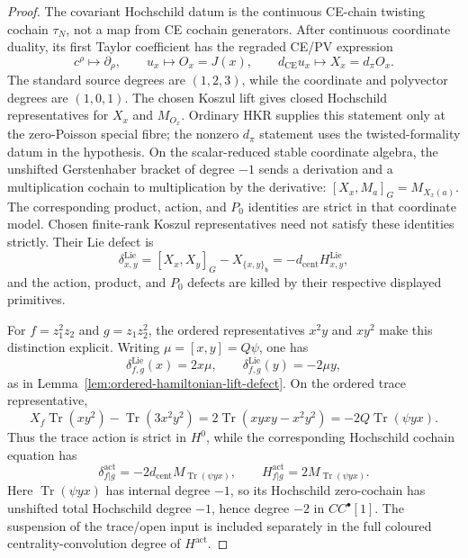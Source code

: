 \begin{proof}
The covariant Hochschild datum is the continuous CE-chain twisting
cochain \(\tau_N\), not a map from CE cochain generators.  After
continuous coordinate duality, its first Taylor coefficient has the
regraded CE/PV expression
\[
  c^\rho\mapsto\partial_\rho,\qquad
  u_x\mapsto O_x=J(x),\qquad
  d_{\mathrm{CE}}u_x\mapsto X_x=d_\pi O_x.
\]
The standard source degrees are \((1,2,3)\), while the coordinate and
polyvector degrees are \((1,0,1)\).  The chosen Koszul lift gives closed
Hochschild representatives for \(X_x\) and \(M_{O_x}\).  Ordinary HKR
supplies this statement only at the zero-Poisson special fibre; the
nonzero \(d_\pi\) statement uses the twisted-formality datum in the
hypothesis.  On the scalar-reduced stable coordinate algebra, the
unshifted Gerstenhaber bracket of degree \(-1\) sends a derivation and a
multiplication cochain to multiplication by the derivative:
\([X_x,M_a]_G=M_{X_x(a)}\).  The corresponding product, action, and
\(P_0\) identities are strict in that coordinate model.  Chosen
finite-rank Koszul representatives need not satisfy these identities
strictly.  Their Lie defect is
\[
  \delta^{\mathrm{Lie}}_{x,y}
    =[X_x,X_y]_G-X_{\{x,y\}_{\mathfrak h}}
    =-d_{\mathrm{cent}}H^{\mathrm{Lie}}_{x,y},
\]
and the action, product, and \(P_0\) defects are killed by their
respective displayed primitives.

For \(f=z_1^2z_2\) and \(g=z_1z_2^2\), the ordered representatives
\(x^2y\) and \(xy^2\) make this distinction explicit.  Writing
\(\mu=[x,y]=Q\psi\), one has
\[
  \delta^{\mathrm{Lie}}_{f,g}(x)=2x\mu,\qquad
  \delta^{\mathrm{Lie}}_{f,g}(y)=-2\mu y,
\]
as in Lemma~\ref{lem:ordered-hamiltonian-lift-defect}.  On the ordered
trace representative,
\[
  X_f\operatorname{Tr}(xy^2)-\operatorname{Tr}(3x^2y^2)
    =2\operatorname{Tr}(xyxy-x^2y^2)
    =-2Q\operatorname{Tr}(\psi yx).
\]
Thus the trace action is strict in \(H^0\), while the corresponding
Hochschild cochain equation has
\[
  \delta^{\mathrm{act}}_{f|g}
    =-2d_{\mathrm{cent}}M_{\operatorname{Tr}(\psi yx)},
  \qquad
  H^{\mathrm{act}}_{f|g}
    =2M_{\operatorname{Tr}(\psi yx)}.
\]
Here \(\operatorname{Tr}(\psi yx)\) has internal degree \(-1\), so its
Hochschild zero-cochain has unshifted total Hochschild degree
\(-1\), hence degree \(-2\) in \(CC^\bullet[1]\).  The suspension of
the trace/open input is included separately in the full coloured
centrality-convolution degree of \(H^{\mathrm{act}}\).


\end{proof}
